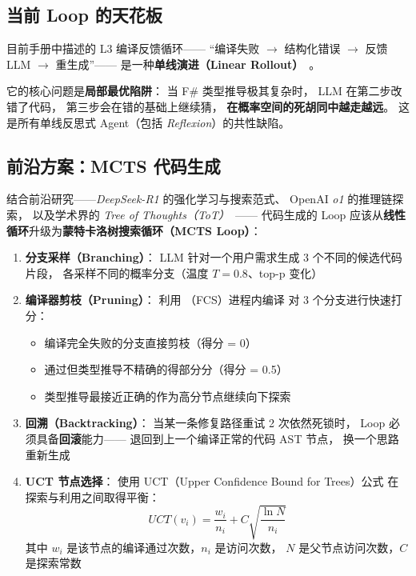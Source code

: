 \documentclass[10pt, openany]{book}
\begin{document}
\subsection{当前 Loop 的天花板}

目前手册中描述的 L3 编译反馈循环——
``编译失败 \(\to\) 结构化错误 \(\to\) 反馈 LLM \(\to\) 重生成''——
是一种\textbf{单线演进（Linear Rollout）}~\cite{Shinn2024Reflexion,Wang2023SelfRefine}。

它的核心问题是\textbf{局部最优陷阱}：
当 F\# 类型推导极其复杂时，
LLM 在第二步改错了代码，
第三步会在错的基础上继续猜，
\textbf{在概率空间的死胡同中越走越远}。
这是所有单线反思式 Agent（包括 \emph{Reflexion}）的共性缺陷。

\subsection{前沿方案：MCTS 代码生成}

结合前沿研究——\emph{DeepSeek-R1} 的强化学习与搜索范式、
OpenAI \emph{o1} 的推理链探索，
以及学术界的 \emph{Tree of Thoughts（ToT）}~\cite{Yao2024TreeOfThoughts}——
代码生成的 Loop 应该从\textbf{线性循环}升级为\textbf{蒙特卡洛树搜索循环（MCTS Loop）}：

\begin{enumerate}
    \item \textbf{分支采样（Branching）}：
        LLM 针对一个用户需求生成 3 个不同的候选代码片段，
        各采样不同的概率分支（温度 \(T=0.8\)、top-p 变化）
    
    \item \textbf{编译器剪枝（Pruning）}：
        利用 （FCS）进程内编译
        对 3 个分支进行快速打分：
        \begin{itemize}
            \item 编译完全失败的分支直接剪枝（得分 = 0）
            \item 通过但类型推导不精确的得部分分（得分 = 0.5）
            \item 类型推导最接近正确的作为高分节点继续向下探索
        \end{itemize}
    
    \item \textbf{回溯（Backtracking）}：
        当某一条修复路径重试 2 次依然死锁时，
        Loop 必须具备\textbf{回滚}能力——
        退回到上一个编译正常的代码 AST 节点，
        换一个思路重新生成
    
    \item \textbf{UCT 节点选择}：
        使用 UCT（Upper Confidence Bound for Trees）公式
        在探索与利用之间取得平衡：
        \[
        UCT(v_i) = \frac{w_i}{n_i} + C \sqrt{\frac{\ln N}{n_i}}
        \]
        其中 \(w_i\) 是该节点的编译通过次数，\(n_i\) 是访问次数，
        \(N\) 是父节点访问次数，\(C\) 是探索常数
\end{enumerate}
\end{document}
